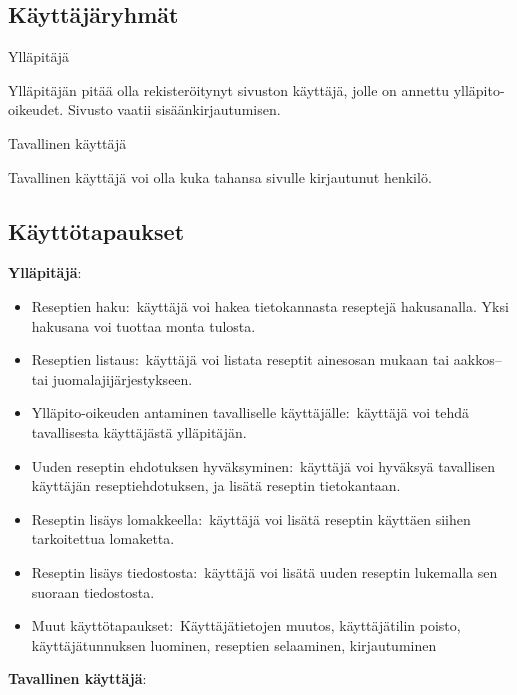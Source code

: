 \documentclass[a4paper]{article}
\begin{document}
\subsection{Käyttäjäryhmät}

\begin{flushleft}Ylläpitäjä\end{flushleft}

Ylläpitäjän pitää olla rekisteröitynyt sivuston käyttäjä, jolle on annettu ylläpito-oikeudet. Sivusto vaatii sisäänkirjautumisen.

\begin{flushleft}Tavallinen käyttäjä\end{flushleft}

Tavallinen käyttäjä voi olla kuka tahansa sivulle kirjautunut henkilö. 

\newpage
\subsection{Käyttötapaukset}

\begin{flushleft}\textbf{Ylläpitäjä\(\colon\)} \end{flushleft}
\begin{itemize}
	\item Reseptien haku\(\colon\) käyttäjä voi hakea tietokannasta reseptejä hakusanalla. Yksi hakusana voi tuottaa monta tulosta.
	\item Reseptien listaus\(\colon\) käyttäjä voi listata reseptit ainesosan mukaan tai aakkos-- tai juomalajijärjestykseen.
	\item Ylläpito-oikeuden antaminen tavalliselle käyttäjälle\(\colon\) käyttäjä voi tehdä tavallisesta käyttäjästä ylläpitäjän. 
	\item Uuden reseptin ehdotuksen hyväksyminen\(\colon\) käyttäjä voi hyväksyä tavallisen käyttäjän reseptiehdotuksen, ja lisätä reseptin tietokantaan.
	\item Reseptin lisäys lomakkeella\(\colon\) käyttäjä voi lisätä reseptin käyttäen siihen tarkoitettua lomaketta.
	\item Reseptin lisäys tiedostosta\(\colon\) käyttäjä voi lisätä uuden reseptin lukemalla sen suoraan tiedostosta. 
	\item Muut käyttötapaukset\(\colon\) Käyttäjätietojen muutos, käyttäjätilin poisto, käyttäjätunnuksen luominen, reseptien selaaminen, kirjautuminen
\end{itemize}

\begin{flushleft}\textbf{Tavallinen käyttäjä\(\colon\)} \end{flushleft}
\end{document}
